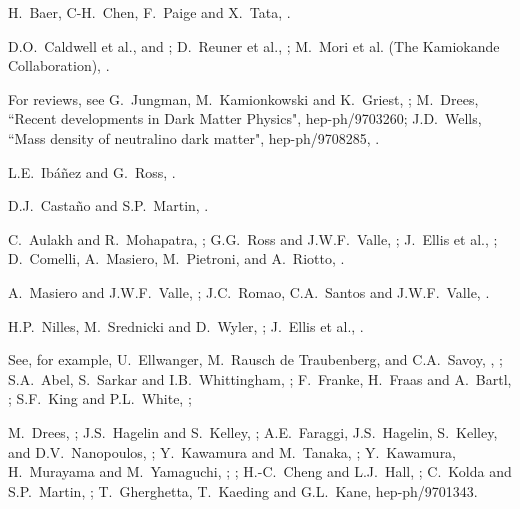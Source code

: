 \begin{thebibliography}{99}
H.~Baer, C-H.~Chen, F.~Paige and X.~Tata,
.

D.O.~Caldwell et al.,  and
;
D.~Reuner et al., ;
M.~Mori et al. (The Kamiokande Collaboration),
.

 For reviews, see
G.~Jungman, M.~Kamionkowski and K.~Griest,
;
M.~Drees, ``Recent developments in Dark Matter Physics",
hep-ph/9703260; J.D.~Wells, ``Mass density of neutralino dark matter",
hep-ph/9708285, \perspectives.

 L.E.~Ib\'a\~nez and G.~Ross,
.

 D.J.~Casta\~no and S.P.~Martin,
. 

 C.~Aulakh and R.~Mohapatra,
; G.G.~Ross and J.W.F.~Valle,
; J.~Ellis et al.,
; D.~Comelli, A.~Masiero, M.~Pietroni, and
A.~Riotto, .

 A.~Masiero and J.W.F.~Valle,
; J.C.~Romao, C.A.~Santos and J.W.F.~Valle,
.


 H.P.~Nilles, M.~Srednicki and D.~Wyler,
; J.~Ellis et al.,
.

 See, for example,
U.~Ellwanger, M.~Rausch de Traubenberg,
and C.A.~Savoy,
,
;
S.A.~Abel, S.~Sarkar and I.B.~Whittingham, ;
F.~Franke, H.~Fraas and A.~Bartl, ;
S.F.~King and P.L.~White, ;

 M.~Drees, ;
J.S.~Hagelin and S.~Kelley, ;
A.E.~Faraggi, J.S.~Hagelin, S.~Kelley, and D.V.~Nanopoulos,
;
Y.~Kawamura and M.~Tanaka, ;
Y.~Kawamura, H.~Murayama and M.~Yamaguchi,
; ;
H.-C.~Cheng and L.J.~Hall, ;
C.~Kolda and S.P.~Martin, ;
T.~Gherghetta, T.~Kaeding and G.L.~Kane, hep-ph/9701343.


\end{thebibliography}
